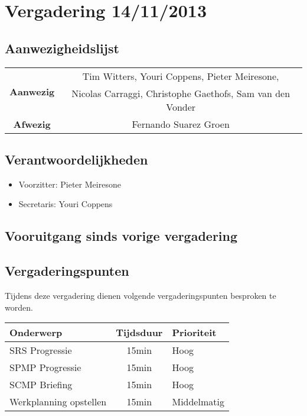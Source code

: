 \section{Vergadering 14/11/2013}
\subsection{Aanwezigheidslijst}
\begin{table}[htbp]
	\centering
	\begin{tabular}{c|c}
		\multirow{2}{*}{\textbf{Aanwezig}} & Tim Witters, Youri Coppens, Pieter Meiresone, \\
		& Nicolas Carraggi,  Christophe Gaethofs, Sam van den Vonder \\
		\hline
		\textbf{Afwezig} & Fernando Suarez Groen\\
	\end{tabular}
\end{table}

\subsection{Verantwoordelijkheden}
\begin{itemize}
	\item Voorzitter: Pieter Meiresone
	\item Secretaris: Youri Coppens 
\end{itemize}

\subsection{Vooruitgang sinds vorige vergadering}
\subsection{Vergaderingspunten}
Tijdens deze vergadering dienen volgende vergaderingspunten besproken te worden.
\begin{table} [H]
	\centering
	\begin{tabular} {l|cl}
		Onderwerp & Tijdsduur & Prioriteit \\
		\hline
		SRS Progressie & 15min & Hoog \\
		SPMP Progressie & 15min & Hoog \\
		SCMP Briefing & 15min & Hoog \\
		Werkplanning opstellen & 15min & Middelmatig
	\end{tabular}
\end{table}

